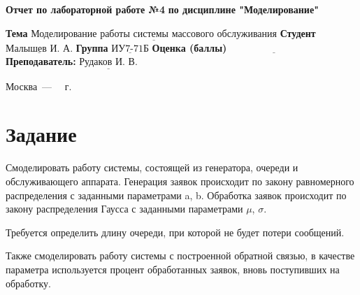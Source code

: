 \documentclass[14pt]{extreport}
\begin{document}
\begin{titlepage}
		
		\begin{center}
			\noindent\begin{minipage}{1.3\textwidth}\centering
				\Large\textbf{  Отчет по лабораторной работе №4}\newline
				\textbf{по дисциплине \newline "Моделирование"}\newline\newline
			\end{minipage}
		\end{center}
		
		\noindent\textbf{Тема} $\underline{\text{Моделирование работы системы массового обслуживания}}$\newline\newline
		\noindent\textbf{Студент} $\underline{\text{Малышев И. А.}}$\newline\newline
		\noindent\textbf{Группа} $\underline{\text{ИУ7-71Б}}$\newline\newline
		\noindent\textbf{Оценка (баллы)} $\underline{\text{~~~~~~~~~~~~~~~~~~~~~~~~~~~}}$\newline\newline
		\noindent\textbf{Преподаватель: } $\underline{\text{Рудаков И. В.}}$\newline\newline\newline
		
		\begin{center}
			\vfill
			Москва~---~\the\year
			~г.
		\end{center}
	\end{titlepage}
	
	
	\setcounter{page}{2}

\chapter{Задание}

Смоделировать работу системы, состоящей из генератора, очереди и обслуживающего аппарата. Генерация заявок происходит по закону равномерного распределения с заданными параметрами a, b. Обработка заявок происходит по закону распределения Гаусса с заданными параметрами $\mu$, $\sigma$.

Требуется определить длину очереди, при которой не будет потери сообщений.

Также смоделировать работу системы с построенной обратной связью, в качестве параметра используется процент обработанных заявок, вновь поступивших на обработку.
\end{document}
